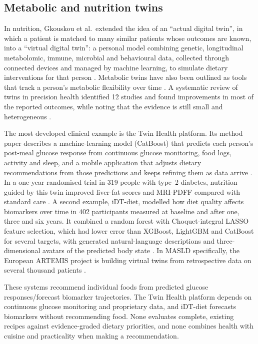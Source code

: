 \subsection{Metabolic and nutrition twins}

In nutrition, Gkouskou et al.\ extended the idea of an ``actual digital twin'', in which a patient is matched to many similar patients whose outcomes are known, into a ``virtual digital twin'': a personal model combining genetic, longitudinal metabolomic, immune, microbial and behavioural data, collected through connected devices and managed by machine learning, to simulate dietary interventions for that person \cite{gkouskou2020virtual}. Metabolic twins have also been outlined as tools that track a person's metabolic flexibility over time \cite{su2025metabolic}. A systematic review of twins in precision health identified 12 studies and found improvements in most of the reported outcomes, while noting that the evidence is still small and heterogeneous \cite{shen2024effectiveness}.

The most developed clinical example is the Twin Health platform. Its method paper describes a machine-learning model (CatBoost) that predicts each person's post-meal glucose response from continuous glucose monitoring, food logs, activity and sleep, and a mobile application that adjusts dietary recommendations from those predictions and keeps refining them as data arrive \cite{twinhealth2024frontiers}. In a one-year randomised trial in 319 people with type~2 diabetes, nutrition guided by this twin improved liver-fat scores and MRI-PDFF compared with standard care \cite{joshi2023digitaltwin}. A second example, iDT-diet, modelled how diet quality affects biomarkers over time in 402 participants measured at baseline and after one, three and six years. It combined a random forest with Choquet-integral LASSO feature selection, which had lower error than XGBoost, LightGBM and CatBoost for several targets, with generated natural-language descriptions and three-dimensional avatars of the predicted body state \cite{nobel2026idtdiet}. In MASLD specifically, the European ARTEMIS project is building virtual twins from retrospective data on several thousand patients \cite{artemis2024}.

These systems recommend individual foods from predicted glucose responses/forecast biomarker trajectories. The Twin Health platform depends on continuous glucose monitoring and proprietary data, and iDT-diet forecasts biomarkers without recommending food. None evaluates complete, existing recipes against evidence-graded dietary priorities, and none combines health with cuisine and practicality when making a recommendation.

